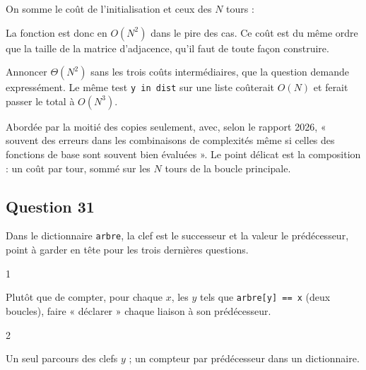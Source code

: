 \documentclass[11pt,a4paper]{article}
\newcommand{\equationajustee}[1]{%
  \sbox{\boiteequation}{$\displaystyle #1$}%
  \ifdim\wd\boiteequation>\linewidth
    \[\resizebox{\linewidth}{!}{\usebox{\boiteequation}}\]%
  \else
    \[#1\]%
  \fi}
\begin{document}
On somme le coût de l'initialisation et ceux des \(N\) tours :

\equationajustee{\begin{aligned}
C(N) &= \Theta(N) + \sum_{t=0}^{N-1} \big( \Theta(N - t) + \Theta(N) \big) \\
&= \Theta(N) + \Theta\!\left(\frac{N(N+1)}{2}\right) + \Theta(N^2).
\end{aligned}}

\equationajustee{\boxed{C(N) = \Theta(N^2)}}

La fonction est donc en \(O(N^2)\) dans le pire des cas. Ce coût est du même ordre que la taille de la matrice d'adjacence, qu'il faut de toute façon construire.

\begin{piege}

Annoncer \(\Theta(N^2)\) sans les trois coûts intermédiaires, que la question demande expressément. Le même test \texttt{y\ in\ dist} sur une liste coûterait \(O(N)\) et ferait passer le total à \(O(N^3)\).

\end{piege}

\begin{jury}

Abordée par la moitié des copies seulement, avec, selon le rapport 2026, « souvent des erreurs dans les combinaisons de complexités même si celles des fonctions de base sont souvent bien évaluées ». Le point délicat est la composition : un coût par tour, sommé sur les \(N\) tours de la boucle principale.

\end{jury}

\hypertarget{question-31}{%
\subsection{Question 31}\label{question-31}}

Dans le dictionnaire \texttt{arbre}, la clef est le successeur et la valeur le prédécesseur, point à garder en tête pour les trois dernières questions.

\begin{indication}{1}

Plutôt que de compter, pour chaque \(x\), les \(y\) tels que \texttt{arbre{[}y{]}\ ==\ x} (deux boucles), faire « déclarer » chaque liaison à son prédécesseur.

\end{indication}

\begin{indication}{2}

Un seul parcours des clefs \(y\) ; un compteur par prédécesseur dans un dictionnaire.

\end{indication}
\end{document}
